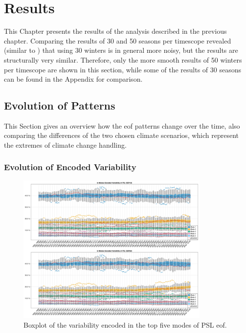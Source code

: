 \chapter{Results}
\label{ch:results}

This Chapter presents the results of the analysis described in the previous chapter. 
Comparing the results of 30 and 50 seasons per timescope revealed (similar to \cite{vietinghoff_visual_2021}) that using 30 winters is in general more noisy, but the results are structurally very similar. 
Therefore, only the more smooth results of 50 winters per timescope are shown in this section, while some of the results of 30 seasons can be found in the Appendix for comparison. 

\section{Evolution of Patterns}
\label{sec:pattern evolution}

This Section gives an overview how the \ac{eof} patterns change over the time, also comparing the differences of the two chosen climate scenarios, which represent the extremes of climate change handling.   

\subsection{Evolution of Encoded Variability}
\label{sec:results encoded variance}


\begin{figure}[htb]
  \begin{center}
    \includegraphics[width=0.85\textwidth]{figures/mode_variability_psl_50seasons.png}
  \end{center}
  \caption{Boxplot of the variability encoded in the top five modes of PSL \ac{eof}.}\label{fig:psl mode variability}
\end{figure}

